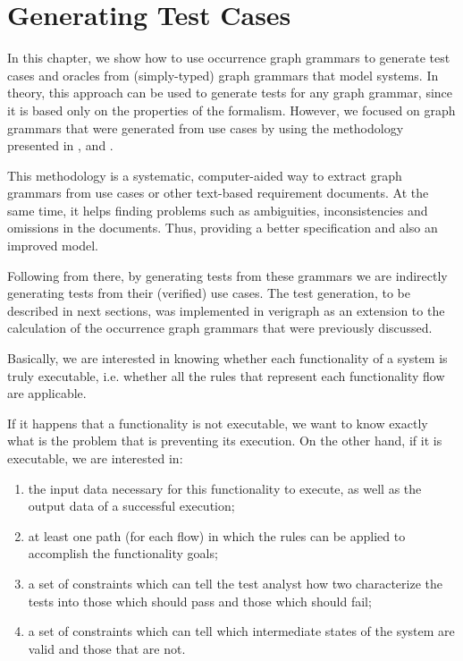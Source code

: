 \chapter{Generating Test Cases}\label{ch:tests}

In this chapter, we show how to use occurrence graph grammars to generate test cases and oracles from (simply-typed) graph grammars that model systems. In theory, this approach can be used to generate tests for any graph grammar, since it is based only on the properties of the formalism. However, we focused on graph grammars that were generated from use cases by using the methodology presented in \cite{Junior2015}, \cite{BezerraWEIT2016} and \cite{Cota2017}.

This methodology is a systematic, computer-aided way to extract graph grammars from use cases or other text-based requirement documents. At the same time, it helps finding problems such as ambiguities, inconsistencies and omissions in the documents. Thus, providing a better specification and also an improved model.

Following from there, by generating tests from these grammars we are indirectly generating tests from their (verified) use cases. The test generation, to be described in next sections, was implemented in verigraph as an extension to the calculation of the occurrence graph grammars that were previously discussed. 

Basically, we are interested in knowing whether each functionality of a system is truly executable, i.e. whether all the rules that represent each functionality flow are applicable.

If it happens that a functionality is not executable, we want to know exactly what is the problem that is preventing its execution. On the other hand, if it is executable, we are interested in:

\begin{enumerate}
\item the input data necessary for this functionality to execute, as well as the output data of a successful execution;

\item at least one path (for each flow) in which the rules can be applied to accomplish the functionality goals;

\item a set of constraints which can tell the test analyst how two characterize the tests into those which should pass and those which should fail;

\item a set of constraints which can tell which intermediate states of the system are valid and those that are not.
\end{enumerate}

